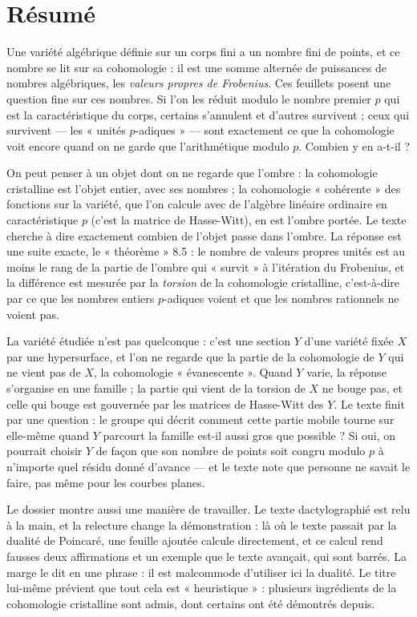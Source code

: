 \documentclass[11pt,a4paper]{article}
\begin{document}
\section*{Résumé}

\begin{resume}
Une variété algébrique définie sur un corps fini a un nombre fini de points,
et ce nombre se lit sur sa cohomologie : il est une somme alternée de
puissances de nombres algébriques, les \emph{valeurs propres de Frobenius}.
Ces feuillets posent une question fine sur ces nombres. Si l'on les réduit
modulo le nombre premier $p$ qui est la caractéristique du corps, certains
s'annulent et d'autres survivent ; ceux qui survivent --- les « unités
$p$-adiques » --- sont exactement ce que la cohomologie voit encore quand on
ne garde que l'arithmétique modulo $p$. Combien y en a-t-il ?

On peut penser à un objet dont on ne regarde que l'ombre : la cohomologie
cristalline est l'objet entier, avec ses nombres ; la cohomologie
« cohérente » des fonctions sur la variété, que l'on calcule avec de
l'algèbre linéaire ordinaire en caractéristique $p$ (c'est la matrice de
Hasse-Witt), en est l'ombre portée. Le texte cherche à dire exactement
combien de l'objet passe dans l'ombre. La réponse est une suite exacte, le
« théorème » 8.5 : le nombre de valeurs propres unités est au moins le rang
de la partie de l'ombre qui « survit » à l'itération du Frobenius, et la
différence est mesurée par la \emph{torsion} de la cohomologie cristalline,
c'est-à-dire par ce que les nombres entiers $p$-adiques voient et que les
nombres rationnels ne voient pas.

La variété étudiée n'est pas quelconque : c'est une section $Y$ d'une
variété fixée $X$ par une hypersurface, et l'on ne regarde que la partie de
la cohomologie de $Y$ qui ne vient pas de $X$, la cohomologie
« évanescente ». Quand $Y$ varie, la réponse s'organise en une famille ;
la partie qui vient de la torsion de $X$ ne bouge pas, et celle qui bouge
est gouvernée par les matrices de Hasse-Witt des $Y$. Le texte finit par une
question : le groupe qui décrit comment cette partie mobile tourne sur
elle-même quand $Y$ parcourt la famille est-il aussi gros que possible ? Si
oui, on pourrait choisir $Y$ de façon que son nombre de points soit congru
modulo $p$ à n'importe quel résidu donné d'avance --- et le texte note que
personne ne savait le faire, pas même pour les courbes planes.

Le dossier montre aussi une manière de travailler. Le texte dactylographié
est relu à la main, et la relecture change la démonstration : là où le texte
passait par la dualité de Poincaré, une feuille ajoutée calcule directement,
et ce calcul rend fausses deux affirmations et un exemple que le texte
avançait, qui sont barrés. La marge le dit en une phrase : il est malcommode
d'utiliser ici la dualité. Le titre lui-même prévient que tout cela est
« heuristique » : plusieurs ingrédients de la cohomologie cristalline sont
admis, dont certains ont été démontrés depuis.

\end{resume}
\end{document}
